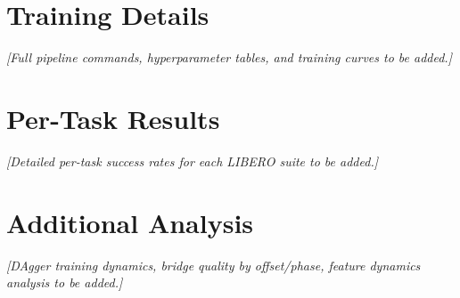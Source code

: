 \documentclass{article}
\begin{document}
\begin{ack}
\end{ack}





\appendix

\section{Training Details}

\textit{[Full pipeline commands, hyperparameter tables, and training curves to be added.]}

\section{Per-Task Results}

\textit{[Detailed per-task success rates for each LIBERO suite to be added.]}

\section{Additional Analysis}

\textit{[DAgger training dynamics, bridge quality by offset/phase, feature dynamics analysis to be added.]}


\newpage

\end{document}
